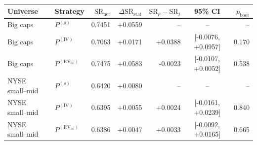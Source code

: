 \begin{tabular}{llrrrcr}
\toprule
Universe & Strategy & $\mathrm{SR}_{\mathrm{net}}$ & $\Delta\mathrm{SR}_{\mathrm{stat}}$ & $\mathrm{SR}_{\rho}-\mathrm{SR}_{j}$ & 95\% CI & $p_{\mathrm{boot}}$ \\
\midrule
Big caps & $P^{(\rho)}$ & 0.7451 & +0.0559 & -- & -- & -- \\
Big caps & $P^{(\mathrm{IV})}$ & 0.7063 & +0.0171 & +0.0388 & [-0.0076, +0.0957] & 0.170 \\
Big caps & $P^{(\mathrm{RV}_{36})}$ & 0.7475 & +0.0583 & -0.0023 & [-0.0107, +0.0052] & 0.538 \\
NYSE small--mid & $P^{(\rho)}$ & 0.6420 & +0.0080 & -- & -- & -- \\
NYSE small--mid & $P^{(\mathrm{IV})}$ & 0.6395 & +0.0055 & +0.0024 & [-0.0161, +0.0239] & 0.840 \\
NYSE small--mid & $P^{(\mathrm{RV}_{36})}$ & 0.6386 & +0.0047 & +0.0033 & [-0.0092, +0.0165] & 0.665 \\
\bottomrule
\end{tabular}
